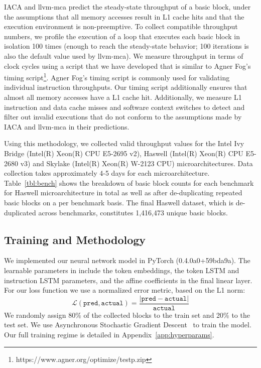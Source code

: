 IACA and llvm-mca predict the steady-state throughput of a basic block, under the assumptions that all memory accesses result in L1 cache hits and that the execution environment is non-preemptive.
To collect compatible throughput numbers, we profile the execution of a loop that executes each basic block in isolation 100 times (enough to reach the steady-state behavior; 100 iterations is also the default value used by llvm-mca).
We measure throughput in terms of clock cycles using a script that we have developed that is similar to Agner Fog's timing script\footnote{https://www.agner.org/optimize/testp.zip}. Agner Fog's timing script is commonly used for validating individual instruction throughputs.
Our timing script additionally ensures that almost all memory accesses have a L1 cache hit.
Additionally, we measure L1 instruction and data cache misses and software context switches to detect and filter out invalid executions that do not conform to the assumptions made by IACA and llvm-mca in their predictions.

Using this methodology, we collected valid throughput values for the Intel Ivy Bridge (Intel(R) Xeon(R) CPU E5-2695 v2), Haswell (Intel(R) Xeon(R) CPU E5-2680 v3) and Skylake (Intel(R) Xeon(R) W-2123 CPU) microarchitectures.
Data collection takes approximately 4-5 days for each microarchitecture.
Table~\ref{tbl:bench} shows the breakdown of basic block counts for each benchmark for Haswell microarchitecture in total as well as after de-duplicating repeated basic blocks on a per benchmark basis.
The final Haswell dataset, which is de-duplicated across benchmarks, constitutes 1,416,473 unique basic blocks.

\subsection{Training and Methodology}
\label{sec:training}

We implemented our neural network model in PyTorch (0.4.0a0+59bda9a).
The learnable parameters in \tool{} include the token embeddings, the token LSTM and instruction LSTM parameters, and the affine coefficients in the final linear layer.
For our loss function we use a normalized error metric, based on the L1 norm:
$$\mathcal{L}(\texttt{pred}, \texttt{actual}) = \frac{|\texttt{pred} - \texttt{actual}|}{\texttt{actual}}$$
We randomly assign 80\% of the collected blocks to the train set and 20\% to the test set.
We use Asynchronous Stochastic Gradient Descent~\cite{SGD,hogwild} to train the model.
Our full training regime is detailed in Appendix~\ref{app:hyperparams}.
